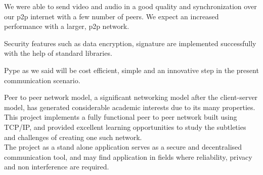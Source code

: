 \documentclass[a4paper,11pt]{article}
\begin{document}
We were able to send video and audio in a good quality and synchronization over our p2p internet with a few number of peers. We expect an increased performance with a larger, p2p network.

Security features such as data encryption, signature are implemented successfully with the help of standard libraries.

Pype as we said will be cost efficient, simple and an innovative step in the present communication scenario.

Peer to peer network model, a significant networking model after the client-server model, has generated considerable academic interests due to its many properties. This project implements a fully functional peer to peer network built using TCP/IP, and provided excellent learning opportunities to study the subtleties and challenges of creating one such network.\\

The project as a stand alone application serves as a secure and decentralised communication tool, and may find application in fields where reliability, privacy and non interference are required.

	\newpage
	\nocite{*}
	
	
\end{document}
